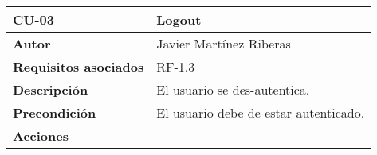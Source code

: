 \begin{longtable}[H]{@{}ll@{}}
\toprule
\begin{minipage}[b]{0.26\columnwidth}\raggedright\strut%
\textbf{CU-03}\strut
\end{minipage} & \begin{minipage}[b]{0.68\columnwidth}\raggedright\strut%
\textbf{Logout}\strut
\end{minipage}\tabularnewline
\midrule
\endhead
\begin{minipage}[t]{0.26\columnwidth}\raggedright\strut
\textbf{Autor}\strut
\end{minipage} & \begin{minipage}[t]{0.68\columnwidth}\raggedright\strut
Javier Martínez Riberas\strut
\end{minipage}\tabularnewline
\begin{minipage}[t]{0.26\columnwidth}\raggedright\strut
\textbf{Requisitos asociados}\strut
\end{minipage} & \begin{minipage}[t]{0.68\columnwidth}\raggedright\strut%
RF-1.3\strut
\end{minipage}\tabularnewline
\begin{minipage}[t]{0.26\columnwidth}\raggedright\strut
\textbf{Descripción}\strut
\end{minipage} & \begin{minipage}[t]{0.68\columnwidth}\raggedright\strut%
El usuario se des-autentica.\strut
\end{minipage}\tabularnewline
\begin{minipage}[t]{0.26\columnwidth}\raggedright\strut
\textbf{Precondición}\strut
\end{minipage} & \begin{minipage}[t]{0.68\columnwidth}\raggedright\strut%
El usuario debe de estar autenticado.\strut
\end{minipage}\tabularnewline
\begin{minipage}[t]{0.26\columnwidth}\raggedright\strut
\textbf{Acciones}\strut
\end{minipage} & \begin{minipage}[t]{0.68\columnwidth}\raggedright\strut%

\end{minipage}
\end{longtable}
